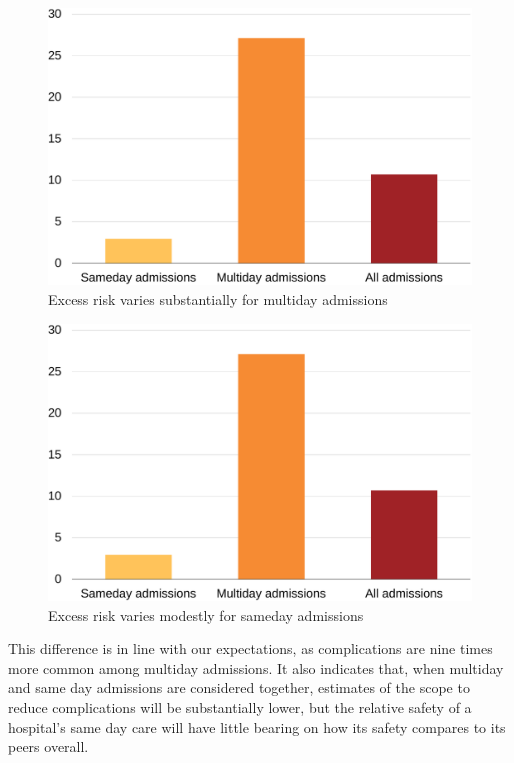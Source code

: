 \documentclass[submission]{grattan}
\begin{document}
\begin{figure}[!t]
\caption{Excess risk varies substantially for multiday admissions}\label{fig:excess-risk-varies-substantially-for-multiday-admissions}
\includegraphics[page=25]{atlas/comps_charts.pdf}
\end{figure}

\begin{figure}[!t]
\caption{Excess risk varies modestly for sameday admissions}\label{fig:excess-risk-varies-modestly-for-sameday-admissions}
\includegraphics[page=26]{atlas/comps_charts.pdf}
\end{figure}

This difference is in line with our expectations, as complications are nine times more common among multiday admissions.
It also indicates that, when multiday and same day admissions are considered together, estimates of the scope to reduce complications will be substantially lower, but the relative safety of a hospital's same day care will have little bearing on how its safety compares to its peers overall.
\end{document}
